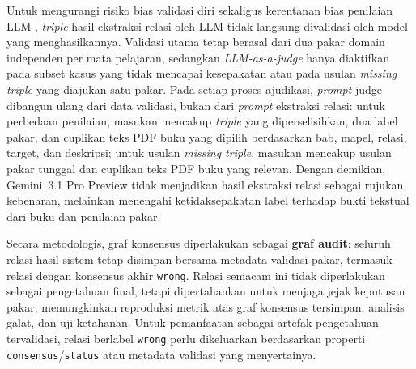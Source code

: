 \documentclass[../../thesis]{subfiles}
\begin{document}
\begin{enumerate}
        Untuk mengurangi risiko bias validasi diri sekaligus kerentanan bias
        penilaian LLM \parencite{gu_survey_2024}, \textit{triple} hasil
        ekstraksi relasi oleh LLM tidak langsung divalidasi oleh model yang
        menghasilkannya. Validasi utama tetap berasal dari dua pakar domain
        independen per mata pelajaran, sedangkan \textit{LLM-as-a-judge} hanya
        diaktifkan pada subset kasus yang tidak mencapai kesepakatan atau pada
        usulan \textit{missing triple} yang diajukan satu pakar. Pada setiap
        proses ajudikasi, \textit{prompt} judge dibangun ulang dari data
        validasi, bukan dari \textit{prompt} ekstraksi relasi: untuk perbedaan
        penilaian, masukan mencakup \textit{triple} yang diperselisihkan, dua
        label pakar, dan cuplikan teks PDF buku yang dipilih berdasarkan bab,
        mapel, relasi, target, dan deskripsi; untuk usulan \textit{missing
        triple}, masukan mencakup usulan pakar tunggal dan cuplikan teks PDF
        buku yang relevan. Dengan demikian, Gemini~3.1 Pro Preview tidak
        menjadikan hasil ekstraksi relasi sebagai rujukan kebenaran, melainkan
        menengahi ketidaksepakatan label terhadap bukti tekstual dari buku dan
        penilaian pakar.

        Secara metodologis, graf konsensus diperlakukan sebagai \textbf{graf
        audit}: seluruh relasi hasil sistem tetap disimpan bersama metadata
        validasi pakar, termasuk relasi dengan konsensus akhir \texttt{wrong}.
        Relasi semacam ini tidak diperlakukan sebagai pengetahuan final, tetapi
        dipertahankan untuk menjaga jejak keputusan pakar, memungkinkan
        reproduksi metrik atas graf konsensus tersimpan, analisis galat, dan uji ketahanan. Untuk pemanfaatan
        sebagai artefak pengetahuan tervalidasi, relasi berlabel \texttt{wrong}
        perlu dikeluarkan berdasarkan properti \texttt{consensus}/\texttt{status}
        atau metadata validasi yang menyertainya.
\end{enumerate}


\end{document}
